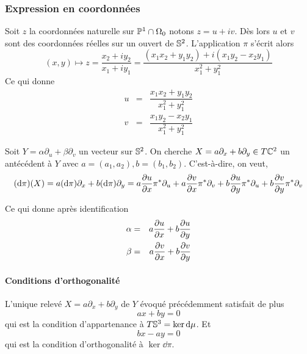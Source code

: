\documentclass[a4paper,10pt]{article}
\begin{document}
\subsubsection{Expression en coordonnées}
Soit $z$ la coordonnées naturelle sur $\Pro^1 \cap \Omega_0$ notons $z = u+iv$. Dès lors $u$ et $v$ sont des coordonnées réelles sur un ouvert de $\S^2$.
L'application $\pi$ s'écrit alors
\[
(x,y) \mapsto z = \dfrac{x_2+iy_2}{x_1+iy_1} = \dfrac{(x_1x_2+y_1y_2)+i(x_1y_2-x_2y_1)}{x_1^2 + y_1^2}
\]
Ce qui donne
\begin{eqnarray*}
u & = & \dfrac{x_1x_2+y_1y_2}{x_1^2 + y_1^2}\\
v & = & \dfrac{x_1y_2-x_2y_1}{x_1^2 + y_1^2}
\end{eqnarray*}

Soit $Y = \alpha \partial_u + \beta \partial_v$ un vecteur sur $\S^2$. On cherche $X = a\partial_x + b\partial_y \in T\C^2$ un antécédent à $Y$ avec $a = (a_1,a_2), b=(b_1,b_2)$. C'est-à-dire, on veut, 
\[
(\dd \pi) (X) = a(\dd \pi) \partial_x + b(\dd \pi) \partial_y = a\dpp{u}{x}\pi^*\partial_u + a\dpp{v}{x}\pi^*\partial_v + b\dpp{u}{y}\pi^*\partial_u + b\dpp{v}{y}\pi^*\partial_v
\]

Ce qui donne après identification
\begin{eqnarray*}
\alpha & = & a\dpp{u}{x}+b\dpp{u}{y}\\
\beta & = & a\dpp{v}{x}+ b\dpp{v}{y}
\end{eqnarray*}

\paragraph{Conditions d'orthogonalité}
L'unique relevé $X = a\partial_x + b\partial_y$ de $Y$ évoqué précédemment satisfait de plus
\[
ax+by =0
\]
qui est la condition d'appartenance à $T\S^3 = \ker \dd \mu$. Et
\[
bx-ay = 0
\]
qui est la condition d'orthogonalité à $\ker \dd \pi$.
\end{document}

